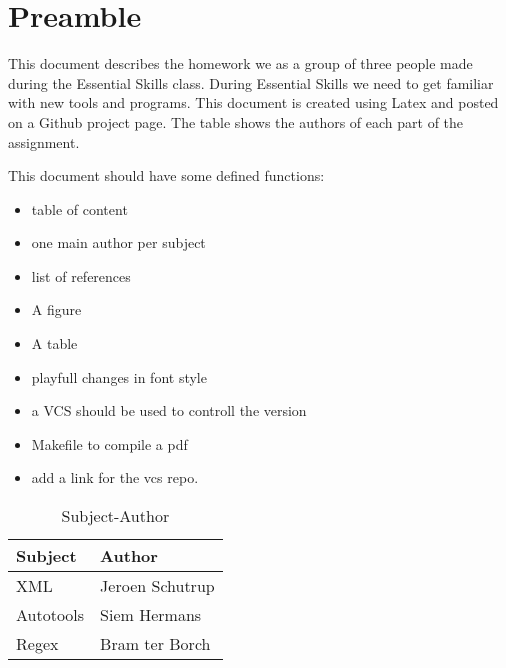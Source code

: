 \section{Preamble}
This document describes the homework we as a group of three people made during the Essential Skills
class. During Essential Skills we need to get familiar with new tools and programs.
This document is created using Latex and posted on a Github project page. The table shows the 
authors of each part of the assignment.

This document should have some defined functions:
\begin{itemize}
	\item table of content
	\item one main author per subject
	\item list of references
	\item A figure
	\item A table
	\item playfull changes in font style
	\item a VCS should be used to controll the version
	\item Makefile to compile a pdf
	\item add a link for the vcs repo.
\end{itemize}

\begin{table}[h]
\begin{center}
\caption{Subject-Author}
\label{table:subject-author}
\begin{tabular}{ | l | l | }
\hline
\textbf{Subject} & \textbf{Author} \\
\hline
XML              & Jeroen Schutrup \\
\hline
Autotools        & Siem Hermans  \\
\hline
Regex            & Bram ter Borch  \\
\hline
\end{tabular}
\end{center}
\end{table}
